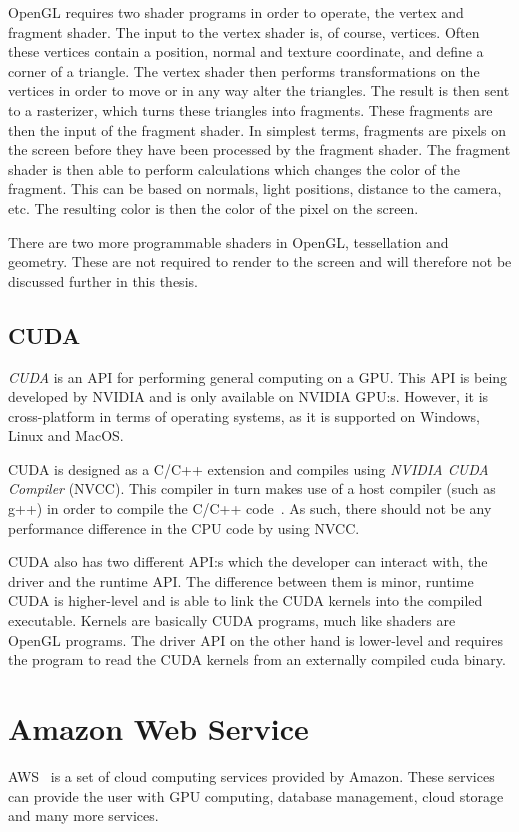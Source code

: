 OpenGL requires two shader programs in order to operate, the vertex and fragment shader.
The input to the vertex shader is, of course, vertices.
Often these vertices contain a position, normal and texture coordinate, and define a corner of a triangle.
The vertex shader then performs transformations on the vertices in order to move or in any way alter the triangles.
The result is then sent to a rasterizer, which turns these triangles into fragments.
These fragments are then the input of the fragment shader.
In simplest terms, fragments are pixels on the screen before they have been processed by the fragment shader.
The fragment shader is then able to perform calculations which changes the color of the fragment.
This can be based on normals, light positions, distance to the camera, etc.
The resulting color is then the color of the pixel on the screen.

There are two more programmable shaders in OpenGL, tessellation and geometry.
These are not required to render to the screen and will therefore not be discussed further in this thesis.

\subsection{CUDA}
\textit{CUDA} is an API for performing general computing on a GPU.
This API is being developed by NVIDIA and is only available on NVIDIA GPU:s.
However, it is cross-platform in terms of operating systems, as it is supported on Windows, Linux and MacOS.

CUDA is designed as a C/C++ extension and compiles using \textit{NVIDIA CUDA Compiler} (NVCC).
This compiler in turn makes use of a host compiler (such as g++) in order to compile the C/C++ code~\cite{nvcc}.
As such, there should not be any performance difference in the CPU code by using NVCC.

CUDA also has two different API:s which the developer can interact with, the driver and the runtime API.
The difference between them is minor, runtime CUDA is higher-level and is able to link the CUDA kernels into the compiled executable.
Kernels are basically CUDA programs, much like shaders are OpenGL programs.
The driver API on the other hand is lower-level and requires the program to read the CUDA kernels from an externally compiled cuda binary.

\newpage

\section{Amazon Web Service}\label{s:aws}
AWS~\cite{aws} is a set of cloud computing services provided by Amazon.
These services can provide the user with GPU computing, database management, cloud storage and many more services.

